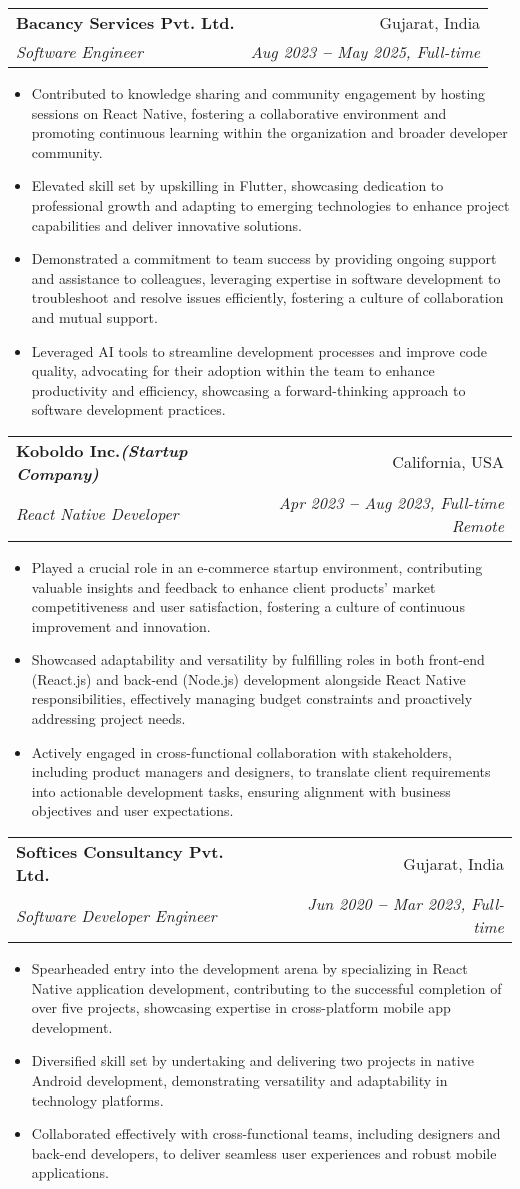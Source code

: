 \documentclass[letterpaper,11pt]{article}
\makeatletter
\newcommand{\resumeItem}[1]{
  \item\small{
    {#1 \vspace{-2pt}}
  }
}
\newcommand{\resumeSubheading}[4]{
  \vspace{-2pt}\item
    \begin{tabular*}{0.97\textwidth}[t]{l@{\extracolsep{\fill}}r}
      \textbf{#1} & #2 \\
      \textit{\small#3} & \textit{\small #4} \\
    \end{tabular*}\vspace{-7pt}
}
\newcommand{\resumeItemListStart}{\begin{itemize}}
\newcommand{\resumeItemListEnd}{\end{itemize}\vspace{-5pt}}
\makeatother
\begin{document}
    \resumeSubheading
      {Bacancy Services Pvt. Ltd.}{Gujarat, India}
      {Software Engineer}{Aug 2023 \textbf{--} May 2025, Full-time}
        \resumeItemListStart
            \resumeItem{Contributed to knowledge sharing and community engagement by hosting sessions on React Native, fostering a collaborative environment and promoting continuous learning within the organization and broader developer community.}
            \resumeItem{Elevated skill set by upskilling in Flutter, showcasing dedication to professional growth and adapting to emerging technologies to enhance project capabilities and deliver innovative solutions.}
            \resumeItem{Demonstrated a commitment to team success by providing ongoing support and assistance to colleagues, leveraging expertise in software development to troubleshoot and resolve issues efficiently, fostering a culture of collaboration and mutual support.}
            \resumeItem{Leveraged AI tools to streamline development processes and improve code quality, advocating for their adoption within the team to enhance productivity and efficiency, showcasing a forward-thinking approach to software development practices.}
        \resumeItemListEnd

    \resumeSubheading
      {Koboldo Inc.{\emph{(Startup Company)}}}{California, USA}
      {React Native Developer}{Apr 2023 \textbf{--} Aug 2023, Full-time Remote}
        \resumeItemListStart
            \resumeItem{Played a crucial role in an e-commerce startup environment, contributing valuable insights and feedback to enhance client products' market competitiveness and user satisfaction, fostering a culture of continuous improvement and innovation.}
            \resumeItem{Showcased adaptability and versatility by fulfilling roles in both front-end (React.js) and back-end (Node.js) development alongside React Native responsibilities, effectively managing budget constraints and proactively addressing project needs.}
            \resumeItem{Actively engaged in cross-functional collaboration with stakeholders, including product managers and designers, to translate client requirements into actionable development tasks, ensuring alignment with business objectives and user expectations.}
        \resumeItemListEnd

    \resumeSubheading
      {Softices Consultancy Pvt. Ltd.}{Gujarat, India}
      {Software Developer Engineer}{Jun 2020 \textbf{--} Mar 2023, Full-time}
        \resumeItemListStart
            \resumeItem{Spearheaded entry into the development arena by specializing in React Native application development, contributing to the successful completion of over five projects, showcasing expertise in cross-platform mobile app development.}
            \resumeItem{Diversified skill set by undertaking and delivering two projects in native Android development, demonstrating versatility and adaptability in technology platforms.}
            \resumeItem{Collaborated effectively with cross-functional teams, including designers and back-end developers, to deliver seamless user experiences and robust mobile applications.}
        \resumeItemListEnd
    
\end{document}
